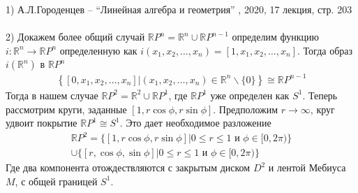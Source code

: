 			1) А.Л.Городенцев -- ``Линейная алгебра и геометрия'' , 2020, 17 лекция, стр. 203\\
			\\
			2) Докажем более общий случай $\mathbb{R} P^{n}=\mathbb{R}^{n} \cup \mathbb{R} P^{n-1}$ определим функцию $i: \mathbb{R}^{n} \rightarrow \mathbb{R} P^{n}$ определенную как $i\left(x_{1}, x_{2}, \dots, x_{n}\right)=\left[1, x_{1}, x_{2}, \dots, x_{n}\right]$. Тогда образ $i\left(\mathbb{R}^{n}\right)$ в $\mathbb{R} P^{n}$
			\begin{gather*}
				\left\{\left[0, x_{1}, x_{2}, \ldots, x_{n}\right] |\left(x_{1}, x_{2}, \ldots, x_{n}\right) \in \mathbb{R}^{n} \backslash\{0\}\right\} \cong \mathbb{R} P^{n-1}
			\end{gather*}
			Тогда в нашем случае $\mathbb{R} P^{2}=\mathbb{R}^{2} \cup \mathbb{R} P^{1}$, где $\mathbb{R} P^{1}$ уже определен как $S^{1}$. Теперь рассмотрим круги, заданные $[1, r \cos \phi, r \sin \phi]$. Предположим $r \rightarrow \infty$, круг удвоит покрытие $\mathbb{R} P^{1} \cong S^{1}$. Это дает необходимое разложение
			\begin{gather*}
				\mathbb{R} P^{2}=\{[1, r \cos \phi, r \sin \phi] | 0 \leq r \leq 1 \text { и } \phi \in[0,2 \pi)\}\\				
				\cup\{[r, \cos \phi, \sin \phi] | 0 \leq r \leq 1 \text { и } \phi \in[0,2 \pi)\}	
			\end{gather*}
			Где два компонента отождествляются с закрытым диском $D^{2}$ и лентой Мебиуса $M$, с общей границей $S^{1}$.\\
			
